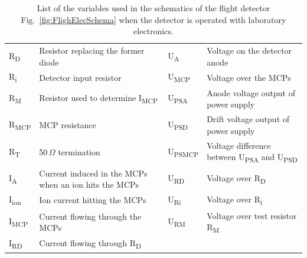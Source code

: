 	\begin{table}[h]
		\begin{center}
		\begin{tabular}{|m{1.5cm}|m{5.4cm}|m{1.5cm}|m{5.4cm}|}
			\hline
			R\textsubscript{D}& Resistor replacing the former diode & U\textsubscript{A}& Voltage on the detector anode \\
			R\textsubscript{i} & Detector input resistor & U\textsubscript{MCP}& Voltage over the MCPs \\
			R\textsubscript{M}& Resistor used to determine I\textsubscript{MCP} &U\textsubscript{PSA} & Anode voltage output of power supply \\
			R\textsubscript{MCP}& MCP resistance & U\textsubscript{PSD} & Drift voltage output of power supply \\
			R\textsubscript{T} & 50\,$\Omega$ termination & U\textsubscript{PSMCP} & Voltage difference  between U\textsubscript{PSA} and U\textsubscript{PSD} \\
			I\textsubscript{A} & Current induced in the MCPs when an ion hits the MCPs & U\textsubscript{RD}& Voltage over R\textsubscript{D} \\
			I\textsubscript{ion} & Ion current hitting the MCPs & U\textsubscript{Ri}& Voltage over R\textsubscript{i} \\
			I\textsubscript{MCP} & Current flowing through the MCPs &U\textsubscript{RM}& Voltage over test resistor R\textsubscript{M}\\
			I\textsubscript{RD} & Current flowing through R\textsubscript{D} &&\\
			\hline
		\end{tabular}
		\end{center}
		\caption{List of the variables used in the schematics of the flight detector Fig.~\ref{fig:FlighElecSchema} when the detector is operated with laboratory electronics.}
		\label{tab:ElecSchemaVariableList}
	\end{table}

